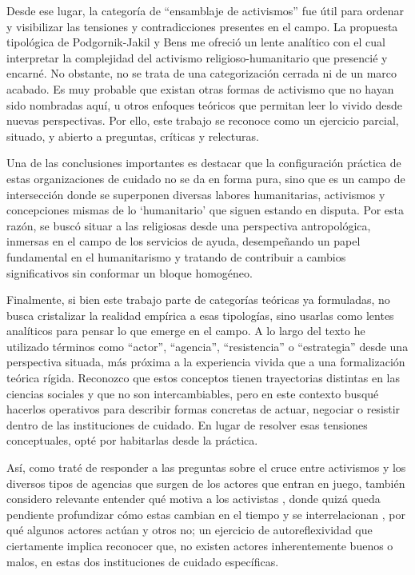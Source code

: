 \documentclass[
  spanish,
  11pt,
  a4paper,
]{scrbook}
\begin{document}
Desde ese lugar, la categoría de ``ensamblaje de activismos'' fue útil
para ordenar y visibilizar las tensiones y contradicciones presentes en
el campo. La propuesta tipológica de Podgornik-Jakil y Bens me ofreció
un lente analítico con el cual interpretar la complejidad del activismo
religioso-humanitario que presencié y encarné. No obstante, no se trata
de una categorización cerrada ni de un marco acabado. Es muy probable
que existan otras formas de activismo que no hayan sido nombradas aquí,
u otros enfoques teóricos que permitan leer lo vivido desde nuevas
perspectivas. Por ello, este trabajo se reconoce como un ejercicio
parcial, situado, y abierto a preguntas, críticas y relecturas.

Una de las conclusiones importantes es destacar que la configuración
práctica de estas organizaciones de cuidado no se da en forma pura, sino
que es un campo de intersección donde se superponen diversas labores
humanitarias, activismos y concepciones mismas de lo `humanitario' que
siguen estando en disputa. Por esta razón, se buscó situar a las
religiosas desde una perspectiva antropológica, inmersas en el campo de
los servicios de ayuda, desempeñando un papel fundamental en el
humanitarismo y tratando de contribuir a cambios significativos sin
conformar un bloque homogéneo.

Finalmente, si bien este trabajo parte de categorías teóricas ya
formuladas, no busca cristalizar la realidad empírica a esas tipologías,
sino usarlas como lentes analíticos para pensar lo que emerge en el
campo. A lo largo del texto he utilizado términos como ``actor'',
``agencia'', ``resistencia'' o ``estrategia'' desde una perspectiva
situada, más próxima a la experiencia vivida que a una formalización
teórica rígida. Reconozco que estos conceptos tienen trayectorias
distintas en las ciencias sociales y que no son intercambiables, pero en
este contexto busqué hacerlos operativos para describir formas concretas
de actuar, negociar o resistir dentro de las instituciones de cuidado.
En lugar de resolver esas tensiones conceptuales, opté por habitarlas
desde la práctica.

Así, como traté de responder a las preguntas sobre el cruce entre
activismos y los diversos tipos de agencias que surgen de los actores
que entran en juego, también considero relevante entender qué motiva a
los activistas \autocite[93]{Willow2020}, donde quizá queda pendiente
profundizar cómo estas cambian en el tiempo y se interrelacionan
\autocite[76]{Schirilla2019}, por qué algunos actores actúan y otros no;
un ejercicio de autoreflexividad que ciertamente implica reconocer que,
no existen actores inherentemente buenos o malos, en estas dos
instituciones de cuidado específicas.
\end{document}
